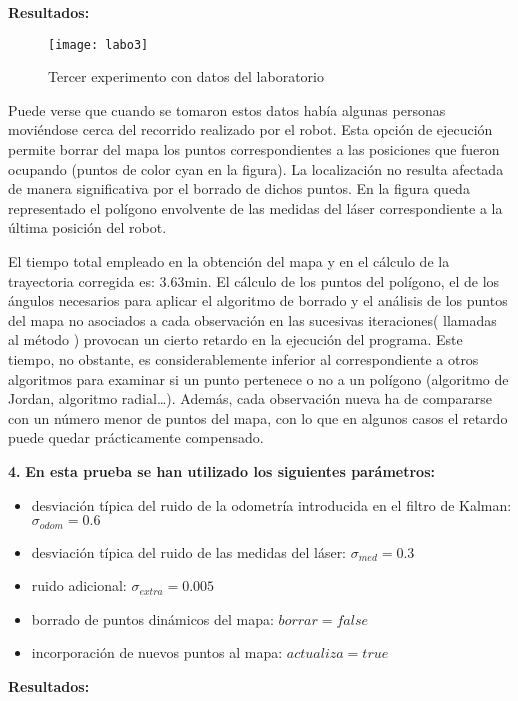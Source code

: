 \textbf{Resultados:}

\begin{figure}[h]
  \centering\texttt{[image: labo3]}\\
  \caption{Tercer experimento con datos del laboratorio}\label{fg:labo3}
\end{figure}

Puede verse que cuando se tomaron estos datos había algunas personas moviéndose cerca del recorrido realizado por el robot. Esta opción de ejecución permite borrar del mapa los puntos correspondientes a las posiciones que fueron ocupando (puntos de color cyan en la figura). La localización no resulta afectada de manera significativa por el borrado de dichos puntos. En la figura queda representado el polígono envolvente de las medidas del láser correspondiente a la última posición del robot.

El tiempo total empleado en la obtención del mapa y en el cálculo de la trayectoria corregida es: 3.63min. El cálculo de los puntos del polígono, el de los ángulos necesarios para aplicar el algoritmo de borrado y el análisis de los puntos del mapa no asociados a cada observación en las sucesivas iteraciones( llamadas al método ) provocan un cierto retardo en la ejecución del programa. Este tiempo, no obstante, es considerablemente inferior al correspondiente a otros algoritmos para examinar si un punto pertenece o no a un polígono (algoritmo de Jordan, algoritmo radial\ldots). Además, cada observación nueva ha de compararse con un número menor de puntos del mapa, con lo que en algunos casos el retardo puede quedar prácticamente compensado.

\textbf{4.} \textbf{En esta prueba se han utilizado los siguientes parámetros:}
\begin{itemize}
  \item desviación típica del ruido de la odometría introducida en el filtro de Kalman: $\sigma_{odom} = 0.6$
  \item desviación típica del ruido de las medidas del láser: $\sigma_{med} = 0.3$
  \item ruido adicional: $\sigma_{extra} = 0.005$
  \item borrado de puntos dinámicos del mapa: $borrar = false$
  \item incorporación de nuevos puntos al mapa: $actualiza = true$
\end{itemize}


\textbf{Resultados:}

